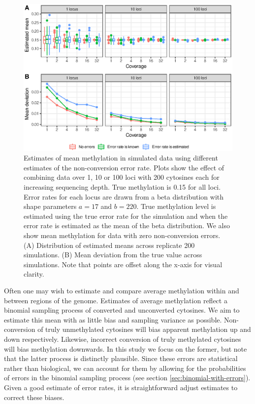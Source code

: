 \documentclass[12pt,longbibliography]{article}
\begin{document}
\begin{figure}
    \includegraphics{figure3.eps}
    \caption{
        Estimates of mean methylation in simulated data using different estimates of the non-conversion error rate.
        Plots show the effect of combining data over 1, 10 or 100 loci with 200 cytosines each for increasing sequencing depth.
        True methylation is 0.15 for all loci.
        Error rates for each locus are drawn from a beta distribution with shape parameters $a=17$ and $b=220$.
        True methylation level is estimated using the true error rate for the simulation and when the error rate is estimated as the mean of the beta distribution.
        We also show mean methylation for data with zero non-conversion errors.
        (A) Distribution of estimated means across replicate 200 simulations.
        (B) Mean deviation from the true value across simulations.
        Note that points are offset along the x-axis for visual clarity.
    }
    \label{fig:simulations}
\end{figure}

Often one may wish to estimate and compare average methylation within and between regions of the genome.
Estimates of average methylation reflect a binomial sampling process of converted and unconverted cytosines.
We aim to estimate this mean with as little bias and sampling variance as possible.
Non-conversion of truly unmethylated cytosines will bias apparent methylation up and down respectively.
Likewise, incorrect conversion of truly methylated cytosines will bias methylation downwards.
In this study we focus on the former, but note that the latter process is distinctly plausible.
Since these errors are statistical rather than biological, we can account for them by allowing for the probabilities of errors in the binomial sampling process (see section \ref{sec:binomial-with-errors}).
Given a good estimate of error rates, it is straightforward adjust estimates to correct these biases.
\end{document}
